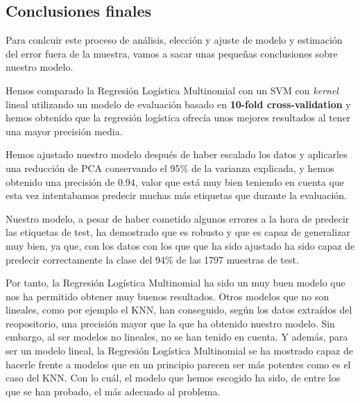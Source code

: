 \documentclass[11pt,a4paper]{article}
\begin{document}
    \subsection{Conclusiones finales}\label{conclusiones-finales}

Para conlcuir este proceso de análisis, elección y ajuste de modelo y estimación
del error fuera de la muestra, vamos a sacar unas pequeñas conclusiones sobre nuestro
modelo.

Hemos comparado la Regresión Logística Multinomial con un SVM con
\emph{kernel} lineal utilizando un modelo de evaluación basado en
\textbf{10-fold cross-validation} y hemos obtenido que la regresión
logística ofrecía unos mejores resultados al tener una mayor precisión
media.

Hemos ajustado nuestro modelo después de haber escalado los datos y
aplicarles una reducción de PCA conservando el 95\% de la varianza
explicada, y hemos obtenido una precisión de \(0.94\), valor que está
muy bien teniendo en cuenta que esta vez intentabamos predecir muchas
más etiquetas que durante la evaluación.

Nuestro modelo, a pesar de haber cometido algunos errores a la hora de
predecir las etiquetas de test, ha demostrado que es robusto y que es
capaz de generalizar muy bien, ya que, con los datos con los que que ha
sido ajustado ha sido capaz de predecir correctamente la clase del 94\%
de las 1797 muestras de test.

Por tanto, la Regresión Logística Multinomial ha sido un muy buen modelo
que nos ha permitido obtener muy buenos resultados. Otros modelos que no
son lineales, como por ejemplo el KNN, han conseguido, según los datos
extraídos del reopositorio, una precisión mayor que la que ha obtenido
nuestro modelo. Sin embargo, al ser modelos no lineales, no se han
tenido en cuenta. Y además, para ser un modelo lineal, la Regresión
Logística Multinomial se ha mostrado capaz de hacerle frente a modelos
que en un principio parecen ser más potentes como es el caso del KNN.
Con lo cuál, el modelo que hemos escogido ha sido, de entre los que se
han probado, el más adecuado al problema.

\newpage
\end{document}
